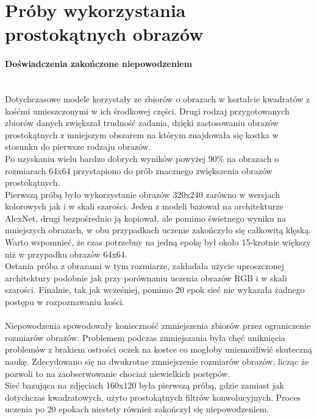 \section{Próby wykorzystania prostokątnych obrazów}
\paragraph{Doświadczenia zakończone niepowodzeniem} \mbox{}\\
Dotychczasowe modele korzystały ze zbiorów o obrazach w kształcie kwadratów z kośćmi
umieszczonymi w ich środkowej części. Drugi rodzaj przygotowanych zbiorów danych zwiększał
trudność zadania, dzięki zastosowaniu obrazów prostokątnych z mniejszym obszarem na
którym znajdowała się kostka w stosunku do pierwsze rodzaju obrazów.\\
Po uzyskaniu wielu bardzo dobrych wyników powyżej 90\% na obrazach o rozmiarach 64x64
przystapiono do prób znacznego zwiększenia obrazów prostokątnych.\\
Pierwszą próbą było wykorzystanie obrazów 320x240 zarówno w wersjach kolorowych jak
i w skali szarości. Jeden z modeli bazował na architekturze AlexNet, drugi bezpośrednio
ją kopiował, ale pomimo świetnego wyniku na mniejszych obrazach, w obu przypadkach
uczenie zakończyło się całkowitą klęską. Warto wspomnieć, że czas potrzebny na
jedną epokę był około 15-krotnie większy niż w przypadku obrazów 64x64.\\
Ostania próba z obrazami w tym rozmiarze, zakładała użycie uproszczonej architektury
podobnie jak przy porównaniu uczenia obrazów RGB i w skali szarości. Finalnie, tak jak
wcześniej, pomimo 20 epok sieć nie wykazała żadnego postępu w rozpoznawaniu kości.\\\\
Niepowodzenia spowodowały konieczność zmniejszenia zbiorów przez ograniczenie rozmiarów obrazów.
Problemem podczas zmniejszania była chęć uniknięcia problemów z brakiem ostrości
oczek na kostce co mogłoby uniemożliwić skuteczną naukę. Zdecydowano się na dwukrotne
zmniejszenie rozmiarów obrazów, licząc że pozwoli to na zaobserwowanie chociaż niewielkich
postępów.\\
Sieć bazująca na zdjęciach 160x120 była pierwszą próbą, gdzie zamiast jak dotychczas
kwadratowych, użyto prostokątnych filtrów konwolucyjnych. Proces uczenia po 20 epokach
niestety również zakończył się niepowodzeniem.

